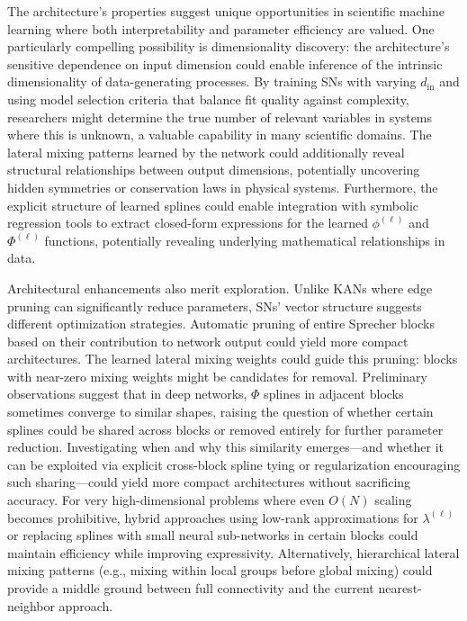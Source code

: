\documentclass{article}
\theoremstyle{plain}
\theoremstyle{definition}
\theoremstyle{remark}
\begin{document}
The architecture's properties suggest unique opportunities in scientific machine learning where both interpretability and parameter efficiency are valued. One particularly compelling possibility is dimensionality discovery: the architecture's sensitive dependence on input dimension could enable inference of the intrinsic dimensionality of data-generating processes. By training SNs with varying $d_{\mathrm{in}}$ and using model selection criteria that balance fit quality against complexity, researchers might determine the true number of relevant variables in systems where this is unknown, a valuable capability in many scientific domains. The lateral mixing patterns learned by the network could additionally reveal structural relationships between output dimensions, potentially uncovering hidden symmetries or conservation laws in physical systems. Furthermore, the explicit structure of learned splines could enable integration with symbolic regression tools to extract closed-form expressions for the learned $\phi^{(\ell)}$ and $\Phi^{(\ell)}$ functions, potentially revealing underlying mathematical relationships in data.

Architectural enhancements also merit exploration. Unlike KANs where edge pruning can significantly reduce parameters, SNs' vector structure suggests different optimization strategies. Automatic pruning of entire Sprecher blocks based on their contribution to network output could yield more compact architectures. The learned lateral mixing weights could guide this pruning: blocks with near-zero mixing weights might be candidates for removal. Preliminary observations suggest that in deep networks, $\Phi$ splines in adjacent blocks sometimes converge to similar shapes, raising the question of whether certain splines could be shared across blocks or removed entirely for further parameter reduction. Investigating when and why this similarity emerges---and whether it can be exploited via explicit cross-block spline tying or regularization encouraging such sharing---could yield more compact architectures without sacrificing accuracy. For very high-dimensional problems where even $O(N)$ scaling becomes prohibitive, hybrid approaches using low-rank approximations for $\lambda^{(\ell)}$ or replacing splines with small neural sub-networks in certain blocks could maintain efficiency while improving expressivity. Alternatively, hierarchical lateral mixing patterns (e.g., mixing within local groups before global mixing) could provide a middle ground between full connectivity and the current nearest-neighbor approach.
\end{document}

